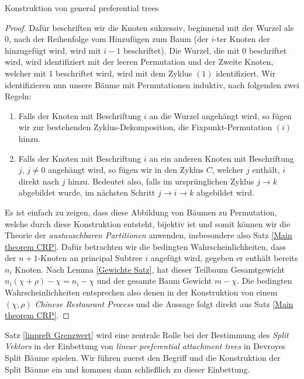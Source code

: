 \begin{section}{Konstruktion von general preferential trees}
\begin{proof}
    Dafür beschriften wir die Knoten sukzessiv, beginnend mit der Wurzel als 0, nach der Reihenfolge vom Hinzufügen zum Baum (der $i$-ter Knoten der hinzugefügt wird, wird mit $i-1$ beschriftet). Die Wurzel, die mit 0 beschriftet wird, wird identifiziert mit der leeren Permutation und der Zweite Knoten, welcher mit 1 beschriftet wird, wird mit dem Zyklus $(1)$ identifiziert. Wir identifizieren nun unsere Bäume mit Permutationen induktiv, nach folgenden zwei Regeln:
    \begin{enumerate}
        \item Falls der Knoten mit Beschriftung $i$ an die Wurzel angehängt wird, so fügen wir zur bestehenden Zyklus-Dekomposition, die Fixpunkt-Permutation $(i)$ hinzu.
        \item Falls der Knoten mit Beschriftung $i$ an ein anderen Knoten mit Beschriftung $j$, $j \neq 0$ angehängt wird, so fügen wir in den Zyklus $C$, welcher $j$ enthält, $i$ direkt nach $j$ hinzu. Bedeutet also, falls im ursprünglichen Zyklus $j \rightarrow k$ abgebildet wurde, im nächsten Schritt $j \rightarrow i \rightarrow k$ abgebildet wird.
    \end{enumerate}
Es ist einfach zu zeigen, dass diese Abbildung von Bäumen zu Permutation, welche durch diese Konstruktion entsteht, bijektiv ist und somit können wir die Theorie der \textit{austauschbaren Partitionen} anwenden, insbesondere also Satz \ref{Main theorem CRP}. Dafür betrachten wir die bedingten Wahrscheinlichkeiten, dass der $n+1$-Knoten an principal Subtree $i$ angefügt wird, gegeben er enthält bereits $n_i$ Knoten. Nach Lemma \ref{Gewichte Satz}, hat dieser Teilbaum Gesamtgewicht $n_i(\chi + \rho) - \chi = n_i - \chi$ und der gesamte Baum Gewicht $m-\chi$. Die bedingten Wahrscheinlichkeiten entsprechen also denen in der Konstruktion von einem $(\chi,\rho)$ \textit{Chinese Restaurant Process} und die Aussage folgt direkt aus Satz \ref{Main theorem CRP}.
\end{proof}
\begin{Bemerkung}
    Satz \ref{linpreft Grenzwert} wird eine zentrale Rolle bei der Bestimmung des \textit{Split Vektors} in der Einbettung von \textit{linear preferential attachment trees} in Devroyes Split Bäume spielen. Wir führen zuerst den Begriff und die Konstruktion der Split Bäume ein und kommen dann schließlich zu dieser Einbettung.  
\end{Bemerkung}
\end{section}
